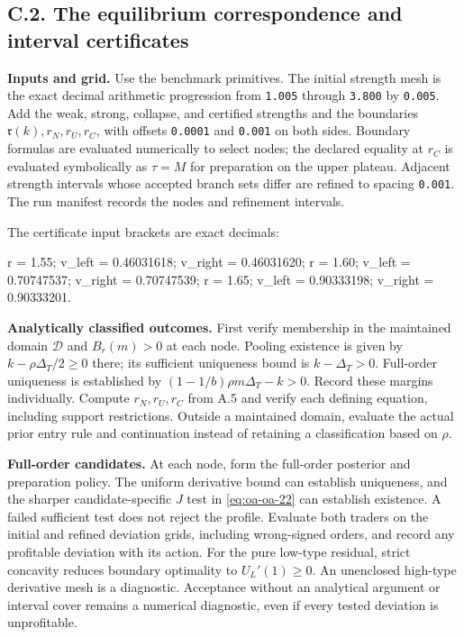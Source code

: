 \documentclass[
  11pt,
]{article}
\newenvironment{Shaded}{}{}
\newcommand{\NormalTok}[1]{#1}
\begin{document}


\subsection{C.2. The equilibrium correspondence and interval
certificates}\label{oa-c-correspondence}

\textbf{Inputs and grid.} Use the benchmark primitives. The initial
strength mesh is the exact decimal arithmetic progression from
\texttt{1.005} through \texttt{3.800} by \texttt{0.005}. Add the weak,
strong, collapse, and certified strengths and the boundaries
\(\mathfrak r(k),r_N,r_U,r_C\), with offsets \texttt{0.0001} and
\texttt{0.001} on both sides. Boundary formulas are evaluated
numerically to select nodes; the declared equality at \(r_C\) is
evaluated symbolically as \(\tau=M\) for preparation on the upper
plateau. Adjacent strength intervals whose accepted branch sets differ
are refined to spacing \texttt{0.001}. The run manifest records the
nodes and refinement intervals.

The certificate input brackets are exact decimals:

\begin{Shaded}
\begin{Highlighting}[]
\NormalTok{r = 1.55; v\_left = 0.46031618; v\_right = 0.46031620;}
\NormalTok{r = 1.60; v\_left = 0.70747537; v\_right = 0.70747539;}
\NormalTok{r = 1.65; v\_left = 0.90333198; v\_right = 0.90333201.}
\end{Highlighting}
\end{Shaded}

\textbf{Analytically classified outcomes.} First verify membership in
the maintained domain \(\mathcal D\) and \(B_r(m)>0\) at each node. Pooling existence is
given by \(k-\rho\Delta_T/2\ge0\) there; its sufficient uniqueness bound
is \(k-\Delta_T>0\). Full-order uniqueness is established by
\((1-1/b)\rho m\Delta_T-k>0\). Record these margins individually.
Compute \(r_N,r_U,r_C\) from A.5 and verify each defining equation,
including support restrictions. Outside a maintained domain, evaluate
the actual prior entry rule and continuation instead of retaining a
classification based on \(\rho\).

\textbf{Full-order candidates.} At each node, form the full-order
posterior and preparation policy. The uniform derivative bound can
establish uniqueness, and the sharper candidate-specific \(J\) test in
\eqref{eq:oa-oa-22} can establish existence. A failed sufficient test
does not reject the profile. Evaluate both traders on the initial and
refined deviation grids, including wrong-signed orders, and record any
profitable deviation with its action. For the pure low-type residual,
strict concavity reduces boundary optimality to \(U_L'(1)\ge0\). An
unenclosed high-type derivative mesh is a diagnostic. Acceptance without
an analytical argument or interval cover remains a numerical diagnostic,
even if every tested deviation is unprofitable.
\end{document}
